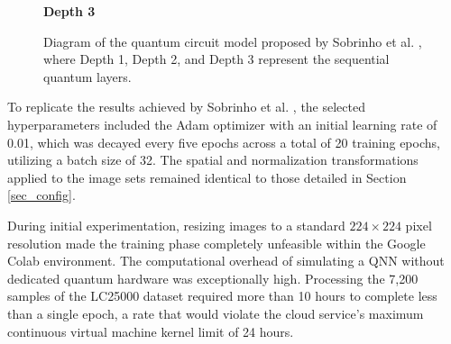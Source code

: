 \begin{figure}[htbp]
    \begin{minipage}{1\textwidth}
        \centering
        \textbf{Depth 3}\\[1ex]
    \end{minipage}

    \caption{Diagram of the quantum circuit model proposed by Sobrinho et al. \cite{quanvolution}, where Depth 1, Depth 2, and Depth 3 represent the sequential quantum layers.}
    \label{fig:quantum_circuit}
\end{figure}

To replicate the results achieved by Sobrinho et al. \cite{quanvolution}, the selected hyperparameters included the Adam optimizer with an initial learning rate of 0.01, which was decayed every five epochs across a total of 20 training epochs, utilizing a batch size of 32. The spatial and normalization transformations applied to the image sets remained identical to those detailed in Section \ref{sec_config}. 

During initial experimentation, resizing images to a standard $224 \times 224$ pixel resolution made the training phase completely unfeasible within the Google Colab environment. The computational overhead of simulating a \gls{QNN} without dedicated quantum hardware was exceptionally high. Processing the 7,200 samples of the \gls{LC25000} dataset required more than 10 hours to complete less than a single epoch, a rate that would violate the cloud service's maximum continuous virtual machine kernel limit of 24 hours.


